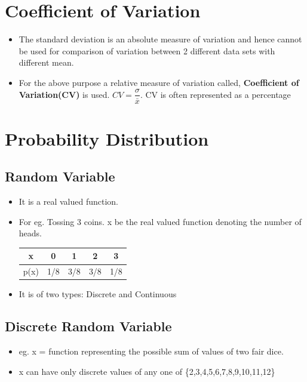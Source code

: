 \documentclass[8pt]{report}
\begin{document}
	\section{Coefficient of Variation}
		\begin{itemize}
			\item The standard deviation is an absolute measure of variation and hence cannot be used for comparison of variation between 2 different data sets with different mean.
			\item For the above purpose a relative measure of variation called, \textbf{Coefficient of Variation(CV)} is used. $\boxed{CV =\dfrac{\sigma}{\bar{x}}}$. CV is often represented as a percentage
		\end{itemize}\hrulefill
	\section{Probability Distribution}
		\subsection{Random Variable}
			\begin{itemize}
				\item It is a real valued function. 
				\item For eg. Tossing 3 coins. x be the real valued function denoting the number of heads. 
				\begin{table}[H]
					\centering 
					\def\arraystretch{1.5}
					\begin{tabular}{|c|c|c|c|c|}
						\hline
						x & 0 & 1 & 2 & 3\\
						\hline
						p(x) & 1/8 & 3/8 & 3/8 & 1/8\\
						\hline 
					\end{tabular}	
				\end{table}
				\item It is of two types: Discrete and Continuous
			\end{itemize}\hrulefill
		\subsection{Discrete Random Variable}
			\begin{itemize}
				\item eg. x = function representing the possible sum of values of two fair dice. 
				\item x can have only discrete values of any one of \{2,3,4,5,6,7,8,9,10,11,12\}
			\end{itemize}\hrulefill
\end{document}
